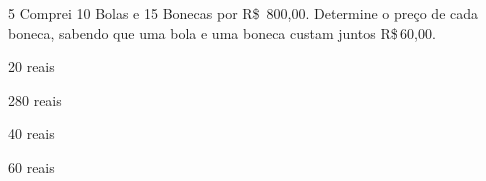 





\num{5} Comprei 10 Bolas e 15 Bonecas por R\$~800,00. Determine o preço de
cada boneca, sabendo que uma bola e uma boneca custam juntos R\$\,60,00.

\begin{escolha}
\item 20 reais
\item 280 reais
\item 40 reais
\item 60 reais
\end{escolha}















